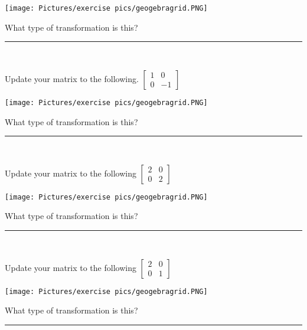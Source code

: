 \begin{center}
\texttt{[image: Pictures/exercise pics/geogebragrid.PNG]}\end{center}

\noindent What type of transformation is this?  \rule{5cm}{0.15mm} \\

\newpage 

\begin{exercise}
Update your matrix to the following.
$\left[\begin{array}{cc}
1 & 0\\
0 & -1
\end{array}\right]$
\end{exercise}

\begin{center}
\texttt{[image: Pictures/exercise pics/geogebragrid.PNG]}\end{center}

\noindent What type of transformation is this?  \rule{5cm}{0.15mm} \\

\begin{exercise}
Update your matrix to the following
$\left[\begin{array}{cc}
2 & 0\\
0 & 2
\end{array}\right]$
\end{exercise}

\begin{center}
\texttt{[image: Pictures/exercise pics/geogebragrid.PNG]}\end{center}


\noindent What type of transformation is this?  \rule{5cm}{0.15mm} \\

\begin{exercise}
Update your matrix to the following
$\left[\begin{array}{cc}
2 & 0\\
0 & 1
\end{array}\right]$
\end{exercise}

\begin{center}
\texttt{[image: Pictures/exercise pics/geogebragrid.PNG]}\end{center}

\noindent What type of transformation is this?  \rule{5cm}{0.15mm} \\

